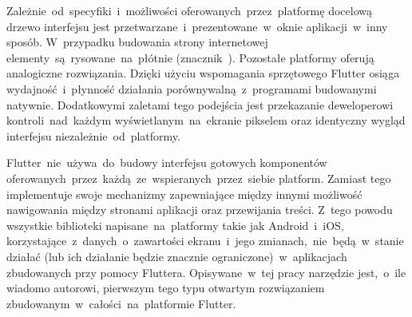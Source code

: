 Zależnie~od~specyfiki~i~możliwości oferowanych~przez~platformę docelową drzewo interfejsu jest przetwarzane~i~prezentowane~w~oknie aplikacji~w~inny sposób. W~przypadku budowania strony internetowej elementy~są~rysowane~na~płótnie (znacznik~). Pozostałe platformy oferują analogiczne rozwiązania. Dzięki użyciu wspomagania sprzętowego Flutter osiąga wydajność~i~płynność działania porównywalną~z~programami budowanymi natywnie. Dodatkowymi zaletami tego podejścia jest przekazanie deweloperowi kontroli~nad~każdym wyświetlanym~na~ekranie pikselem oraz identyczny wygląd interfejsu niezależnie~od~platformy.

Flutter~nie~używa~do~budowy interfejsu gotowych komponentów oferowanych~przez~każdą~ze~wspieranych~przez~siebie platform. Zamiast tego implementuje swoje mechanizmy zapewniające między innymi możliwość nawigowania między stronami aplikacji oraz przewijania treści. Z~tego powodu wszystkie biblioteki napisane~na~platformy takie jak Android~i~iOS, korzystające~z~danych~o~zawartości ekranu~i~jego zmianach,~nie~będą~w~stanie działać (lub ich działanie będzie znacznie ograniczone)~w~aplikacjach zbudowanych przy pomocy Fluttera. Opisywane~w~tej pracy narzędzie jest,~o~ile wiadomo autorowi, pierwszym tego typu otwartym rozwiązaniem zbudowanym~w~całości~na~platformie Flutter.


